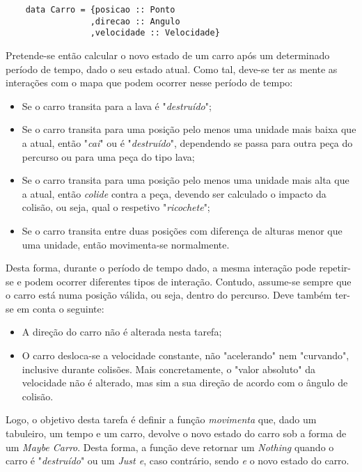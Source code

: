 \documentclass[a4paper]{report}
\begin{document}
\begin{verbatim}
    data Carro = {posicao :: Ponto
                 ,direcao :: Angulo
                 ,velocidade :: Velocidade}
\end{verbatim}
 Pretende-se então calcular o novo estado de um carro após um determinado período de tempo, dado o seu estado atual. Como tal, deve-se ter as mente as interações com o mapa que podem ocorrer nesse período de tempo:
 
 \begin{itemize}
     \item Se o carro transita para a lava é "\textit{destruído}";
     \item Se o carro transita para uma posição pelo menos uma unidade mais baixa que a atual, então "\textit{cai}" ou é "\textit{destruído}", dependendo se passa para outra peça do percurso ou para uma peça do tipo lava;
     \item Se o carro transita para uma posição pelo menos uma unidade mais alta que a atual, então \textit{colide} contra a peça, devendo ser calculado o impacto da colisão, ou seja, qual o respetivo "\textit{ricochete}";
     \item Se o carro transita entre duas posições com diferença de alturas menor que uma unidade, então movimenta-se normalmente.
 \end{itemize}

Desta forma, durante o período de tempo dado, a mesma interação pode repetir-se e podem ocorrer diferentes tipos de interação. Contudo, assume-se sempre que o carro está numa posição válida, ou seja, dentro do percurso. Deve também ter-se em conta o seguinte:

\begin{itemize}
    \item A direção do carro não é alterada nesta tarefa;
    \item O carro desloca-se a velocidade constante, não "acelerando" nem "curvando", inclusive durante colisões. Mais concretamente, o "valor absoluto" da velocidade não é alterado, mas sim a sua direção de acordo com o ângulo de colisão.
\end{itemize}

Logo, o objetivo desta tarefa é definir a função \textit{movimenta} que, dado um tabuleiro, um tempo e um carro, devolve o novo estado do carro sob a forma de um \textit{Maybe Carro}. Desta forma, a função deve retornar um \textit{Nothing} quando o carro é "\textit{destruído}" ou um \textit{Just e}, caso contrário, sendo \textit{e} o novo estado do carro.
\end{document}
